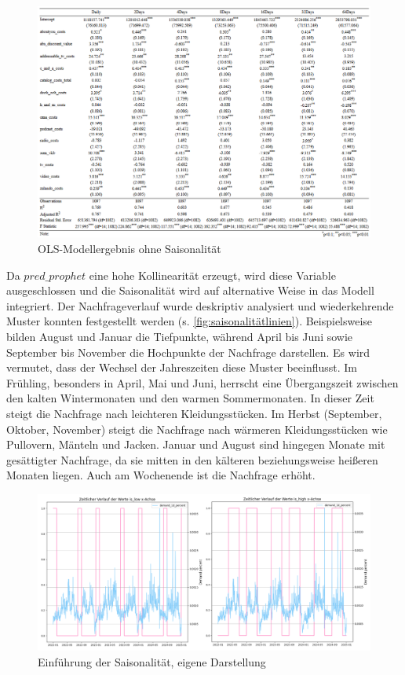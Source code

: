 \begin{figure}[H]
    \centering
    \includegraphics[width=1\linewidth]{images/ols2.png}
    \caption{\ac{OLS}-Modellergebnis ohne Saisonalität}
    \label{fig:OLSohneSaison}
\end{figure}
\noindent
Da \(pred\_prophet\) eine hohe Kollinearität erzeugt, wird diese Variable ausgeschlossen und die Saisonalität wird auf alternative Weise in das Modell integriert. Der Nachfrageverlauf wurde deskriptiv analysiert und wiederkehrende Muster konnten festgestellt werden (s. \autoref{fig:saisonalitätlinien}). Beispielsweise bilden August und Januar die Tiefpunkte, während April bis Juni sowie September bis November die Hochpunkte der Nachfrage darstellen. Es wird vermutet, dass der Wechsel der Jahreszeiten diese Muster beeinflusst. Im Frühling, besonders in April, Mai und Juni, herrscht eine Übergangszeit zwischen den kalten Wintermonaten und den warmen Sommermonaten. In dieser Zeit steigt die Nachfrage nach leichteren Kleidungsstücken. Im Herbst (September, Oktober, November) steigt die Nachfrage nach wärmeren Kleidungsstücken wie Pullovern, Mänteln und Jacken. Januar und August sind hingegen Monate mit gesättigter Nachfrage, da sie mitten in den kälteren beziehungsweise heißeren Monaten liegen. Auch am Wochenende ist die Nachfrage erhöht. \par
\begin{figure}[H]
    \centering
    \includegraphics[width=1\linewidth]{images/nachfrageverlauf.png}
    \caption{Einführung der Saisonalität, eigene Darstellung}
    \label{fig:saisonalitätlinien}
\end{figure}
